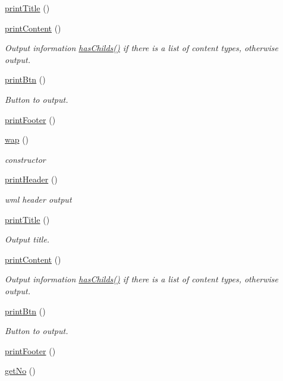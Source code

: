 \begin{DoxyCompactItemize}
\hyperlink{classwap_a048fa1324853c9d69e795c7d34f7ad8b}{print\+Title} ()
\item 
\hyperlink{classwap_a1edebe2b6a90ec08ab149ad2b2866dbd}{print\+Content} ()
\begin{DoxyCompactList}\small\item\em Output information \hyperlink{classmobileXE_a680f6a6b774bf12be4c67b6a9215f1ea}{has\+Childs()} if there is a list of content types, otherwise output. \end{DoxyCompactList}\item 
\hyperlink{classwap_a47437aad53e77ce53aebb4db6240cc38}{print\+Btn} ()
\begin{DoxyCompactList}\small\item\em Button to output. \end{DoxyCompactList}\item 
\hyperlink{classwap_a1fd1c1dca866c9b6653499cabf124980}{print\+Footer} ()
\item 
\hyperlink{classwap_a7b4befeef8257c63a0ffe3012a84560b}{wap} ()
\begin{DoxyCompactList}\small\item\em constructor \end{DoxyCompactList}\item 
\hyperlink{classwap_a402c6a180ae759c7a173a67441dfb716}{print\+Header} ()
\begin{DoxyCompactList}\small\item\em wml header output \end{DoxyCompactList}\item 
\hyperlink{classwap_a048fa1324853c9d69e795c7d34f7ad8b}{print\+Title} ()
\begin{DoxyCompactList}\small\item\em Output title. \end{DoxyCompactList}\item 
\hyperlink{classwap_a1edebe2b6a90ec08ab149ad2b2866dbd}{print\+Content} ()
\begin{DoxyCompactList}\small\item\em Output information \hyperlink{classmobileXE_a680f6a6b774bf12be4c67b6a9215f1ea}{has\+Childs()} if there is a list of content types, otherwise output. \end{DoxyCompactList}\item 
\hyperlink{classwap_a47437aad53e77ce53aebb4db6240cc38}{print\+Btn} ()
\begin{DoxyCompactList}\small\item\em Button to output. \end{DoxyCompactList}\item 
\hyperlink{classwap_a1fd1c1dca866c9b6653499cabf124980}{print\+Footer} ()
\item 
\hyperlink{classwap_a4ac2316bf5cb56e0c351a97e04142e28}{get\+No} ()
\end{DoxyCompactItemize}
